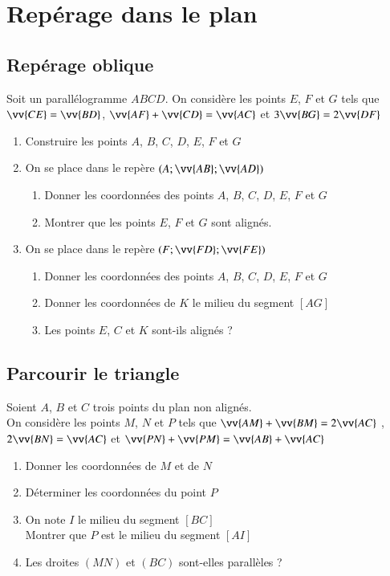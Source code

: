 \documentclass[oneside,12pt]{article}          %
\begin{document}
\section{Repérage dans le plan}

\subsection{Repérage oblique}
Soit un parallélogramme $ABCD$. On considère les points $E$, $F$ et $G$ tels que $\vv{CE}=\vv{BD}$, $\vv{AF}+\vv{CD}=\vv{AC}$ et $3\vv{BG}=2\vv{DF}$
\begin{enumerate}
    \item Construire les points $A$, $B$, $C$, $D$, $E$, $F$ et $G$
    \item On se place dans le repère $(A;\vv{AB};\vv{AD})$
    \begin{enumerate}
        \item Donner les coordonnées des points $A$, $B$, $C$, $D$, $E$, $F$ et $G$
        \item Montrer que les points $E$, $F$ et $G$ sont alignés.
    \end{enumerate}
    \item On se place dans le repère $(F;\vv{FD};\vv{FE})$
    \begin{enumerate}
        \item Donner les coordonnées des points $A$, $B$, $C$, $D$, $E$, $F$ et $G$
        \item Donner les coordonnées de $K$ le milieu du segment $[AG]$
        \item Les points $E$, $C$ et $K$ sont-ils alignés ?
    \end{enumerate}
\end{enumerate}



\subsection{Parcourir le triangle}
Soient $A$, $B$ et $C$ trois points du plan non alignés.\\
On considère les points $M$, $N$ et $P$ tels que $\vv{AM}+\vv{BM}=2\vv{AC}$ , $2\vv{BN}=\vv{AC}$ et $\vv{PN}+\vv{PM}=\vv{AB}+\vv{AC}$
\begin{enumerate}
    \item Donner les coordonnées de $M$ et de $N$
    \item Déterminer les coordonnées du point $P$
    \item On note $I$ le milieu du segment $[BC]$\\
    Montrer que $P$ est le milieu du segment $[AI]$
    \item Les droites $(MN)$ et $(BC)$ sont-elles parallèles ?
\end{enumerate}
\end{document}
